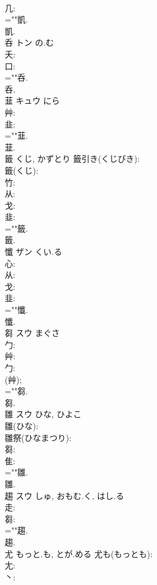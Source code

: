 \documentclass[8pt]{extreport}
\begin{document}
\begin{CJK}{UTF8}{min}
\\	几: 
\\	=""凱.
\\	凱.
\\	呑	トン	の.む		
\\	夭: 
\\	口: 
\\	=""呑.
\\	呑.
\\	韮	キュウ	にら		
\\	艸: 
\\	韭: 
\\	=""韮.
\\	韮.
\\	籤		くじ, かずとり			籤引き(くじびき): 
\\	籤(くじ): 
\\	竹: 
\\	从: 
\\	戈: 
\\	韭: 
\\	=""籤.
\\	籤.
\\	懺	ザン	くい.る				
\\	心: 
\\	从: 
\\	戈: 
\\	韭: 
\\	=""懺.
\\	懺.
\\	芻	スウ	まぐさ		
\\	勹: 
\\	艸: 
\\	勹: 
\\	(艸); 
\\	=""芻.
\\	芻.
\\	雛	スウ	ひな, ひよこ		
\\	雛(ひな): 
\\	雛祭(ひなまつり): 
\\	芻: 
\\	隹: 
\\	=""雛.
\\	雛.
\\	趨	スウ	しゅ, おもむ.く, はし.る		
\\	走: 
\\	芻: 
\\	=""趨.
\\	趨.
\\	尤		もっと.も, とが.める			尤も(もっとも): 
\\	尢: 
\\	丶: 

\end{CJK}
\end{document}

